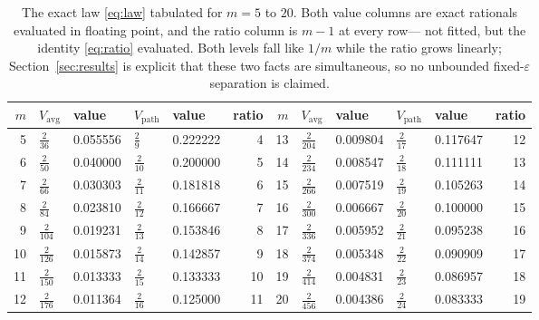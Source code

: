 \begin{table}[t]
\caption{The exact law \eqref{eq:law} tabulated for $m=5$ to $20$. Both value columns are
exact rationals evaluated in floating point, and the ratio column is $m-1$ at every row---
not fitted, but the identity \eqref{eq:ratio} evaluated. Both levels fall like $1/m$ while
the ratio grows linearly; Section~\ref{sec:results} is explicit that these two facts are
simultaneous, so no unbounded fixed-$\varepsilon$ separation is claimed.}
\label{tab:law}
\centering
\footnotesize
\setlength{\tabcolsep}{5pt}
\begin{tabular}{@{}rllllr@{\hspace{10pt}}|@{\hspace{10pt}}rllllr@{}}
\toprule
$m$ & $V_{\mathrm{avg}}$ & value & $V_{\mathrm{path}}$ & value & ratio & $m$ & $V_{\mathrm{avg}}$ & value & $V_{\mathrm{path}}$ & value & ratio \\
\midrule
5 & $\frac{2}{36}$ & 0.055556 & $\frac{2}{9}$ & 0.222222 & 4 & 13 & $\frac{2}{204}$ & 0.009804 & $\frac{2}{17}$ & 0.117647 & 12 \\
6 & $\frac{2}{50}$ & 0.040000 & $\frac{2}{10}$ & 0.200000 & 5 & 14 & $\frac{2}{234}$ & 0.008547 & $\frac{2}{18}$ & 0.111111 & 13 \\
7 & $\frac{2}{66}$ & 0.030303 & $\frac{2}{11}$ & 0.181818 & 6 & 15 & $\frac{2}{266}$ & 0.007519 & $\frac{2}{19}$ & 0.105263 & 14 \\
8 & $\frac{2}{84}$ & 0.023810 & $\frac{2}{12}$ & 0.166667 & 7 & 16 & $\frac{2}{300}$ & 0.006667 & $\frac{2}{20}$ & 0.100000 & 15 \\
9 & $\frac{2}{104}$ & 0.019231 & $\frac{2}{13}$ & 0.153846 & 8 & 17 & $\frac{2}{336}$ & 0.005952 & $\frac{2}{21}$ & 0.095238 & 16 \\
10 & $\frac{2}{126}$ & 0.015873 & $\frac{2}{14}$ & 0.142857 & 9 & 18 & $\frac{2}{374}$ & 0.005348 & $\frac{2}{22}$ & 0.090909 & 17 \\
11 & $\frac{2}{150}$ & 0.013333 & $\frac{2}{15}$ & 0.133333 & 10 & 19 & $\frac{2}{414}$ & 0.004831 & $\frac{2}{23}$ & 0.086957 & 18 \\
12 & $\frac{2}{176}$ & 0.011364 & $\frac{2}{16}$ & 0.125000 & 11 & 20 & $\frac{2}{456}$ & 0.004386 & $\frac{2}{24}$ & 0.083333 & 19 \\
\bottomrule
\end{tabular}
\end{table}
